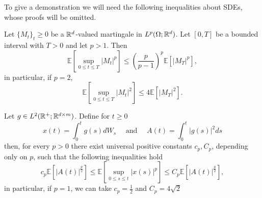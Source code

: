 To give a demonstration we will need the following inequalities about SDEs, whose proofs will be omitted.
\begin{theorem}
	\label{thm:Doobs}
	Let $\{M_t\}_t\geq 0$ be a $\mathbb{R}^d$-valued martingale in $L^{p}(\Omega;\mathbb{R}^d)$. Let $[0,T]$ be a bounded interval with $T>0$ and let $p>1$. Then
	\begin{equation}
		\mathbb{E}\left[ \sup_{0\leq t\leq T}|M_t|^p\right]\leq \left(\frac{p}{p-1}\right)^p \mathbb{E}[|M_T|^p],
	\end{equation}
	in particular, if $p=2$,
	\begin{equation}
		\mathbb{E}\left[ \sup_{0\leq t\leq T}|M_t|^2\right]\leq4 \mathbb{E}[|M_T|^2].
	\end{equation}
\end{theorem}
\begin{theorem}
 \label{thm:BDGineq}
	Let $g\in L^2(\mathbb{R}^+;\mathbb{R}^{d\times m})$. Define for $t\geq 0$
	\begin{equation*}
		x(t)=\int_{0}^{t}g(s)dW_s\quad \text{ and }\quad  A(t)=\int_{0}^{t}|g(s)|^2 ds
	\end{equation*}
	then, for every $p>0$ there exist universal positive constants $c_p,C_p$, depending only on $p$, such that the following inequalities hold
	\begin{equation}
		c_p\mathbb{E}[|A(t)|^{\frac{p}{2}}]\leq \mathbb{E}\left[\sup_{0\leq s\leq t}|x(s)|^p\right]\leq C_p\mathbb{E}[|A(t)|^{\frac{p}{2}}],
	\end{equation}
in particular, if $p=1$, we can take $c_p=\frac{1}{2}$ and $C_p=4\sqrt{2}$
\end{theorem}
